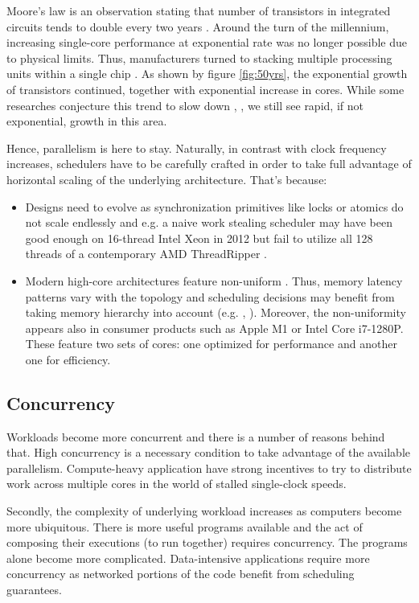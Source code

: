 \documentclass[12pt,a4paper,twoside]{report}
\begin{document}
Moore's law is an observation stating that number of transistors in integrated circuits tends to double every two years \cite{Moore2006}. Around the turn of the millennium, increasing single-core performance at exponential rate was no longer possible due to physical limits. Thus, manufacturers turned to stacking multiple processing units within a single chip \cite{Geer2005}. As shown by figure \ref{fig:50yrs}, the exponential growth of transistors continued, together with exponential increase in cores. While some researches conjecture this trend to slow down \cite{6307773}, \cite{mooremulti}, we still see rapid, if not exponential, growth in this area.

Hence, parallelism is here to stay. Naturally, in contrast with clock frequency increases, schedulers have to be carefully crafted in order to take full advantage of horizontal scaling of the underlying architecture. That's because:
\begin{itemize}
    \item Designs need to evolve as synchronization primitives like locks or atomics do not scale endlessly and e.g. a naive work stealing scheduler may have been good enough on 16-thread Intel Xeon in 2012 but fail to utilize all 128 threads of a contemporary AMD ThreadRipper  \cite{Castello2016}. 
    \item Modern high-core architectures feature non-uniform . Thus, memory latency patterns vary with the topology and scheduling decisions may benefit from taking memory hierarchy into account (e.g. \cite{Drebes2016}, \cite{faverge:inria-00416502}). Moreover, the non-uniformity appears also in consumer products such as Apple M1 or Intel Core i7-1280P. These feature two sets of cores: one optimized for performance and another one for efficiency.
\end{itemize}

\subsection{Concurrency}
\label{section:intr_software_conc}
Workloads become more concurrent and there is a number of reasons behind that. High concurrency is a necessary condition to take advantage of the available parallelism. Compute-heavy application have strong incentives to try to distribute work across multiple cores in the world of stalled single-clock speeds. 

Secondly, the complexity of underlying workload increases as computers become more ubiquitous. There is more useful programs available and the act of composing their executions (to run together) requires concurrency. The programs alone become more complicated. Data-intensive applications \cite{Kleppmann2017-en} require more concurrency as networked portions of the code benefit from scheduling guarantees. 
\end{document}
